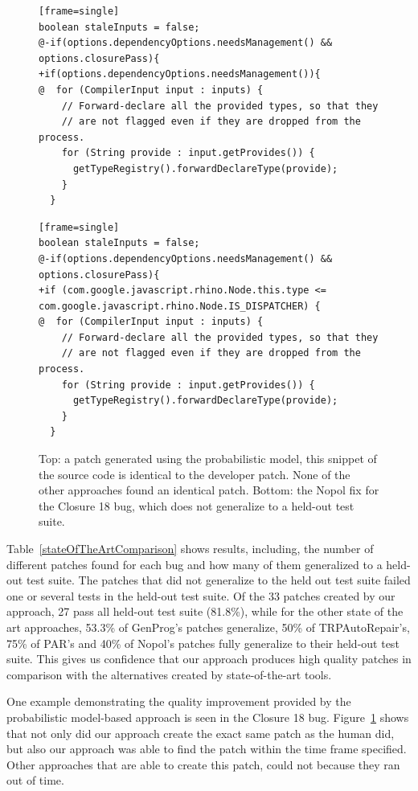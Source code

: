 \documentclass[conference]{IEEEtran}
\begin{document}
\begin{figure}[t]
\begin{lstlisting}[firstnumber=1284][frame=single]
boolean staleInputs = false;
@-if(options.dependencyOptions.needsManagement() && options.closurePass){
+if(options.dependencyOptions.needsManagement()){
@  for (CompilerInput input : inputs) {
    // Forward-declare all the provided types, so that they
    // are not flagged even if they are dropped from the process.
    for (String provide : input.getProvides()) {
      getTypeRegistry().forwardDeclareType(provide);
    }  
  }
	\end{lstlisting}


\begin{lstlisting}[firstnumber=1284][frame=single]
boolean staleInputs = false;
@-if(options.dependencyOptions.needsManagement() && options.closurePass){
+if (com.google.javascript.rhino.Node.this.type <= com.google.javascript.rhino.Node.IS_DISPATCHER) {
@  for (CompilerInput input : inputs) {
    // Forward-declare all the provided types, so that they
    // are not flagged even if they are dropped from the process.
    for (String provide : input.getProvides()) {
      getTypeRegistry().forwardDeclareType(provide);
    }  
  }
	\end{lstlisting}

	\caption{Top: a patch generated using the probabilistic model, this snippet of the source code is identical to the developer patch. None of the other
      approaches found an identical patch.  Bottom: the Nopol fix for the
      Closure 18 bug, which does not generalize to a held-out test
      suite.\label{closure18prob}}
\end{figure}


Table~\ref{stateOfTheArtComparison} shows
results, including, the number of different patches found for each bug and how many of them generalized
to a held-out test suite. The patches that did not generalize to the held out test suite failed one or 
several tests in the held-out test suite. Of the
33 patches created by our approach, 
27 pass all held-out test suite (81.8\%), while for the other state of the art approaches,
53.3\% of GenProg's patches generalize, 50\% of TRPAutoRepair's, 75\% of PAR's and 40\% of Nopol's patches fully generalize to their held-out test suite.
This gives us confidence that our approach produces high
quality patches in comparison with the alternatives created by state-of-the-art
tools. 

One example demonstrating the quality improvement provided by the probabilistic
model-based approach is seen in the Closure 18 bug. Figure~\ref{closure18prob} 
shows that not only did our approach create the exact
same patch as the human did, but also our approach was able to find the patch
within the time frame specified. Other approaches that are able to create this
patch, could not because they ran out of time.
\end{document}

